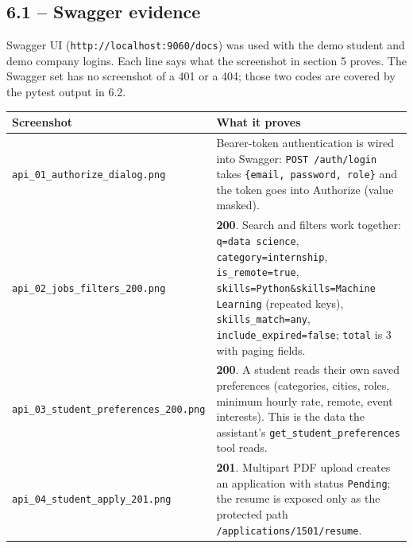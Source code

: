 \documentclass[11pt,letterpaper]{article}
\newcommand{\code}[1]{\texttt{#1}}
\begin{document}
\subsection*{6.1 -- Swagger evidence}

Swagger UI (\code{http:\allowbreak{}/\allowbreak{}/\allowbreak{}localhost:\allowbreak{}9060/\allowbreak{}docs}) was used with the demo student and demo company logins. Each line says what the screenshot in section 5 proves. The Swagger set has no screenshot of a 401 or a 404; those two codes are covered by the pytest output in 6.2.

{\small
\begin{longtable}{>{\raggedright\arraybackslash}p{}>{\raggedright\arraybackslash}p{}}
\hline
\textbf{Screenshot} & \textbf{What it proves} \\ \hline
\endhead
\code{api\_\allowbreak{}01\_\allowbreak{}authorize\_\allowbreak{}dialog.\allowbreak{}png} & Bearer-token authentication is wired into Swagger: \code{POST /\allowbreak{}auth/\allowbreak{}login} takes \code{\{email,\allowbreak{} password,\allowbreak{} role\}} and the token goes into Authorize (value masked). \\ \hline
\code{api\_\allowbreak{}02\_\allowbreak{}jobs\_\allowbreak{}filters\_\allowbreak{}200.\allowbreak{}png} & \textbf{200}. Search and filters work together: \code{q=\allowbreak{}data science}, \code{category=\allowbreak{}internship}, \code{is\_\allowbreak{}remote=\allowbreak{}true}, \code{skills=\allowbreak{}Python\&skills=\allowbreak{}Machine Learning} (repeated keys), \code{skills\_\allowbreak{}match=\allowbreak{}any}, \code{include\_\allowbreak{}expired=\allowbreak{}false}; \code{total} is 3 with paging fields. \\ \hline
\code{api\_\allowbreak{}03\_\allowbreak{}student\_\allowbreak{}preferences\_\allowbreak{}200.\allowbreak{}png} & \textbf{200}. A student reads their own saved preferences (categories, cities, roles, minimum hourly rate, remote, event interests). This is the data the assistant's \code{get\_\allowbreak{}student\_\allowbreak{}preferences} tool reads. \\ \hline
\code{api\_\allowbreak{}04\_\allowbreak{}student\_\allowbreak{}apply\_\allowbreak{}201.\allowbreak{}png} & \textbf{201}. Multipart PDF upload creates an application with status \code{Pending}; the resume is exposed only as the protected path \code{/\allowbreak{}applications/\allowbreak{}1501/\allowbreak{}resume}. \\ \hline

\end{longtable}}
\end{document}

